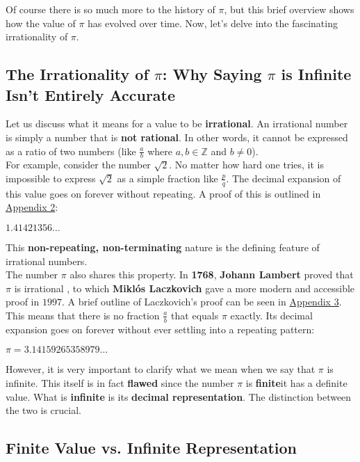 \documentclass[12pt]{article}
\begin{document}
\noindent Of course there is so much more to the history of $\pi$, but this brief overview shows how the value of $\pi$ has evolved over time. Now, let's delve into the fascinating irrationality of $\pi$.

\subsection{The Irrationality of $\pi$: Why Saying $\pi$ is Infinite Isn't Entirely Accurate}

\noindent Let us discuss what it means for a value to be \textbf{irrational}. An irrational number is simply a number that is \textbf{not rational}. In other words, it cannot be expressed as a ratio of two numbers (like $\frac{a}{b}$ where $a,b \in \mathbb{Z}$ and $b \neq 0$).\\

\noindent For example, consider the number $\sqrt{2}$. No matter how hard one tries, it is impossible to express $\sqrt{2}$ as a simple fraction like $\frac{p}{q}$. The decimal expansion of this value goes on forever without repeating. A proof of this is outlined in \hyperref[appendix:2]{Appendix 2}:
\begin{center}
    $1.41421356\ldots$
\end{center}
This \textbf{non-repeating, non-terminating} nature is the defining feature of irrational numbers.\\

\noindent The number $\pi$ also shares this property. In \textbf{1768}, \textbf{Johann Lambert} proved that $\pi$ is irrational \cite{Denis}, to which \textbf{Miklós Laczkovich} gave a more modern and accessible proof in $1997$. A brief outline of Laczkovich's proof can be seen in \hyperref[appendix:3]{Appendix 3}. This means that there is no fraction $\frac{a}{b}$ that equals $\pi$ exactly. Its decimal expansion goes on forever without ever settling into a repeating pattern:
\begin{center}
    $\pi = 3.14159265358979\ldots$
\end{center}

\noindent However, it is very important to clarify what we mean when we say that $\pi$ is infinite. This itself is in fact \textbf{flawed} since the number $\pi$ is \textbf{finite}\textendash it has a definite value. What is \textbf{infinite} is its \textbf{decimal representation}. The distinction between the two is crucial.

\subsection{Finite Value vs. Infinite Representation}
\end{document}
